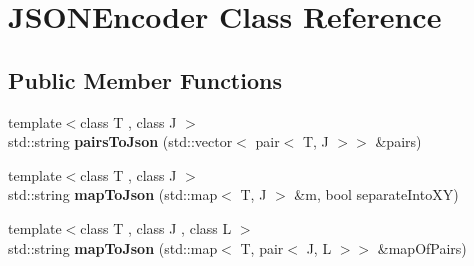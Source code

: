 \hypertarget{classJSONEncoder}{}\section{J\+S\+O\+N\+Encoder Class Reference}
\label{classJSONEncoder}
\subsection*{Public Member Functions}
\begin{DoxyCompactItemize}
\item 
\mbox{\label{classJSONEncoder_a617c19c9745055c54b62839b43993148}} 
{\footnotesize template$<$class T , class J $>$ }\\std\+::string {\bfseries pairs\+To\+Json} (std\+::vector$<$ pair$<$ T, J $>$$>$ \&pairs)
\item 
\mbox{\label{classJSONEncoder_ae23d931048cc9826daecc247f394bd2a}} 
{\footnotesize template$<$class T , class J $>$ }\\std\+::string {\bfseries map\+To\+Json} (std\+::map$<$ T, J $>$ \&m, bool separate\+Into\+XY)
\item 
\mbox{\label{classJSONEncoder_a2dd29be303702a064dd34cf2c811179a}} 
{\footnotesize template$<$class T , class J , class L $>$ }\\std\+::string {\bfseries map\+To\+Json} (std\+::map$<$ T, pair$<$ J, L $>$$>$ \&map\+Of\+Pairs)
\end{DoxyCompactItemize}
